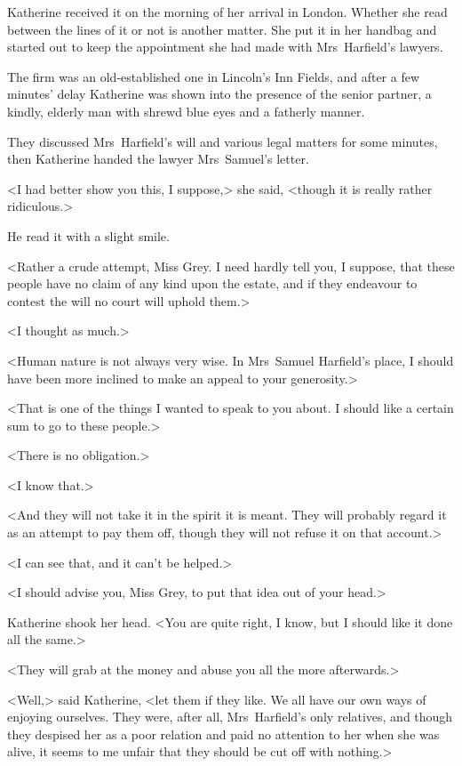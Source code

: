 Katherine received it on the morning of her arrival in London. Whether she read between the lines of it or not is another matter. She put it in her handbag and started out to keep the appointment she had made with Mrs~Harfield's lawyers.

The firm was an old-established one in Lincoln's Inn Fields, and after a few minutes' delay Katherine was shown into the presence of the senior partner, a kindly, elderly man with shrewd blue eyes and a fatherly manner.

They discussed Mrs~Harfield's will and various legal matters for some minutes, then Katherine handed the lawyer Mrs~Samuel's letter.

<I had better show you this, I suppose,> she said, <though it is really rather ridiculous.>

He read it with a slight smile.

<Rather a crude attempt, Miss Grey. I need hardly tell you, I suppose, that these people have no claim of any kind upon the estate, and if they endeavour to contest the will no court will uphold them.>

<I thought as much.>

<Human nature is not always very wise. In Mrs~Samuel Harfield's place, I should have been more inclined to make an appeal to your generosity.>

<That is one of the things I wanted to speak to you about. I should like a certain sum to go to these people.>

<There is no obligation.>

<I know that.>

<And they will not take it in the spirit it is meant. They will probably regard it as an attempt to pay them off, though they will not refuse it on that account.>

<I can see that, and it can't be helped.>

<I should advise you, Miss Grey, to put that idea out of your head.>

Katherine shook her head. <You are quite right, I know, but I should like it done all the same.>

<They will grab at the money and abuse you all the more afterwards.>

<Well,> said Katherine, <let them if they like. We all have our own ways of enjoying ourselves. They were, after all, Mrs~Harfield's only relatives, and though they despised her as a poor relation and paid no attention to her when she was alive, it seems to me unfair that they should be cut off with nothing.>

